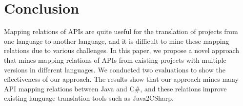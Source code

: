 \section{Conclusion}
\label{sec:conclusion}

Mapping relations of APIs are quite useful for the translation
of projects from one language to another language, and
it is difficult to mine these mapping relations due to various
challenges. In this paper, we propose a novel approach that mines mapping
relations of APIs from existing projects with multiple versions in
different languages. We conducted two evaluations to show the effectiveness
of our approach. The results show that our approach mines many API mapping
relations between Java and C\#, and these relations improve existing language
translation tools such as Java2CSharp.
